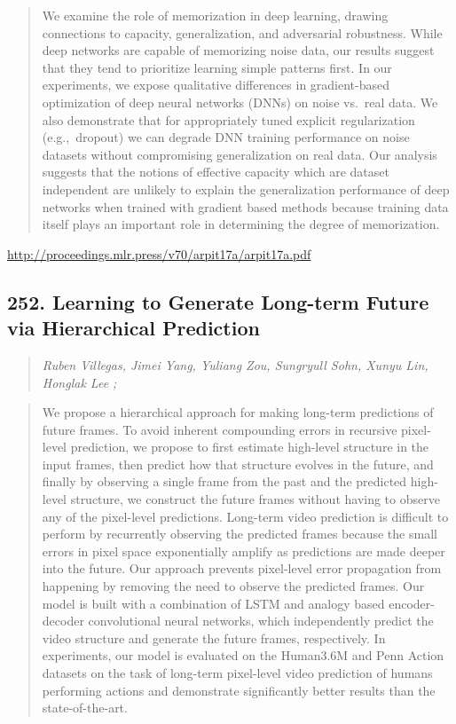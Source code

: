 \documentclass{article}
\begin{document}
\begin{quote}
    We examine the role of memorization in deep learning, drawing connections to capacity, generalization, and adversarial robustness. While deep networks are capable of memorizing noise data, our results suggest that they tend to prioritize learning simple patterns first. In our experiments, we expose qualitative differences in gradient-based optimization of deep neural networks (DNNs) on noise vs.~real data. We also demonstrate that for appropriately tuned explicit regularization (e.g.,~dropout) we can degrade DNN training performance on noise datasets without compromising generalization on real data. Our analysis suggests that the notions of effective capacity which are dataset independent are unlikely to explain the generalization performance of deep networks when trained with gradient based methods because training data itself plays an important role in determining the degree of memorization.  
\end{quote}

\href{http://proceedings.mlr.press/v70/arpit17a/arpit17a.pdf}{http://proceedings.mlr.press/v70/arpit17a/arpit17a.pdf}

\subsection{252. Learning to Generate Long-term Future via Hierarchical Prediction}

\begin{quote}
\footnotesize{\textit{Ruben Villegas, Jimei Yang, Yuliang Zou, Sungryull Sohn, Xunyu Lin, Honglak Lee ;}}

\end{quote}

\begin{quote}
    We propose a hierarchical approach for making long-term predictions of future frames. To avoid inherent compounding errors in recursive pixel-level prediction, we propose to first estimate high-level structure in the input frames, then predict how that structure evolves in the future, and finally by observing a single frame from the past and the predicted high-level structure, we construct the future frames without having to observe any of the pixel-level predictions. Long-term video prediction is difficult to perform by recurrently observing the predicted frames because the small errors in pixel space exponentially amplify as predictions are made deeper into the future. Our approach prevents pixel-level error propagation from happening by removing the need to observe the predicted frames. Our model is built with a combination of LSTM and analogy based encoder-decoder convolutional neural networks, which independently predict the video structure and generate the future frames, respectively. In experiments, our model is evaluated on the Human3.6M and Penn Action datasets on the task of long-term pixel-level video prediction of humans performing actions and demonstrate significantly better results than the state-of-the-art.  
\end{quote}
\end{document}

